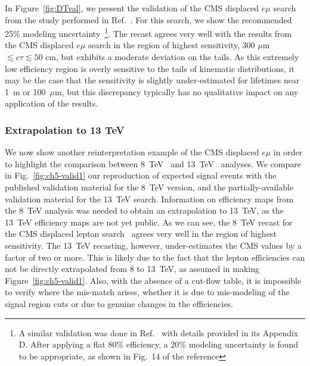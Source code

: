 In Figure~\ref{fig:DTval}, we present the validation of the CMS displaced $e\mu$
search~\cite{Khachatryan:2014mea} from the study performed
in Ref.~\cite{Evans:2016zau}. For this search, we show the recommended 25\% modeling
uncertainty~\footnote{A similar validation was done in Ref.~\cite{Liu:2015bma} with details
provided in its Appendix D. After applying a flat $80\%$ efficiency, a $20\%$ modeling uncertainty
is found to be appropriate, as shown in Fig.~14 of the reference}. The recast agrees
very well with the results from the CMS displaced
$e\mu$ search in the region of highest sensitivity, 300 $\mu$m $\lesssim c\tau
\lesssim 50$ cm, but exhibits a moderate deviation on the tails. As this
extremely low efficiency region is overly sensitive to the tails of kinematic
distributions, it may be the case that the sensitivity is slightly under-estimated
for lifetimes near 1~m or 100~$\mu$m, but this discrepancy typically has no
qualitative impact on any application of the results.

\subsubsection{Extrapolation to 13 TeV}

We now show another reinterpretation example of the CMS displaced $e\mu$ in
order to highlight the comparison between 8~TeV~\cite{Khachatryan:2014mea} and 
13~TeV~\cite{CMS-PAS-EXO-16-022} analyses. We compare in
Fig.~\ref{fig:ch5-valid1} our reproduction of expected signal events with the
published validation material for the 8~TeV version, and the partially-available
validation material for the 13~TeV search.
Information on efficiency maps from the 8~TeV analysis was needed
to obtain an extrapolation to 13~TeV, as the 13~TeV efficiency
 maps are not yet public.
As we can see, the 8~TeV recast for the CMS displaced lepton
search~\cite{Khachatryan:2014mea} agrees very well in the region of highest
sensitivity. The 13~TeV recasting, however, under-estimates the CMS values
by a factor of two or more. This is likely due to the fact that the
lepton efficiencies can not be directly extrapolated from 8 to 13~TeV,
as assumed in making Figure~\ref{fig:ch5-valid1}.
Also, with the absence of a cut-flow table, it is impossible to verify where the
mis-match arises, whether it is due to mis-modeling of the signal region
cuts or  due to genuine changes in the efficiencies.

